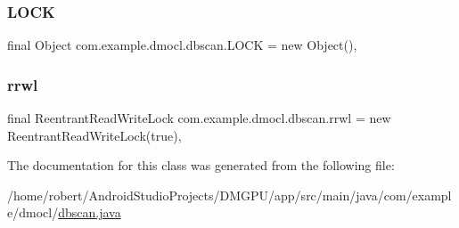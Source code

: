 \subsubsection{\texorpdfstring{L\+O\+CK}{LOCK}}
{\footnotesize\ttfamily final Object com.\+example.\+dmocl.\+dbscan.\+L\+O\+CK = new Object()\hspace{0.3cm}{\ttfamily [static]}, {\ttfamily [private]}}

\mbox{\label{classcom_1_1example_1_1dmocl_1_1dbscan_a1a5afc44bad3ba73e68b4a298e42beba}} 
\subsubsection{\texorpdfstring{rrwl}{rrwl}}
{\footnotesize\ttfamily final Reentrant\+Read\+Write\+Lock com.\+example.\+dmocl.\+dbscan.\+rrwl = new Reentrant\+Read\+Write\+Lock(true)\hspace{0.3cm}{\ttfamily [static]}, {\ttfamily [private]}}



The documentation for this class was generated from the following file\+:\begin{DoxyCompactItemize}
\item 
/home/robert/\+Android\+Studio\+Projects/\+D\+M\+G\+P\+U/app/src/main/java/com/example/dmocl/\mbox{\hyperlink{dbscan_8java}{dbscan.\+java}}\end{DoxyCompactItemize}
